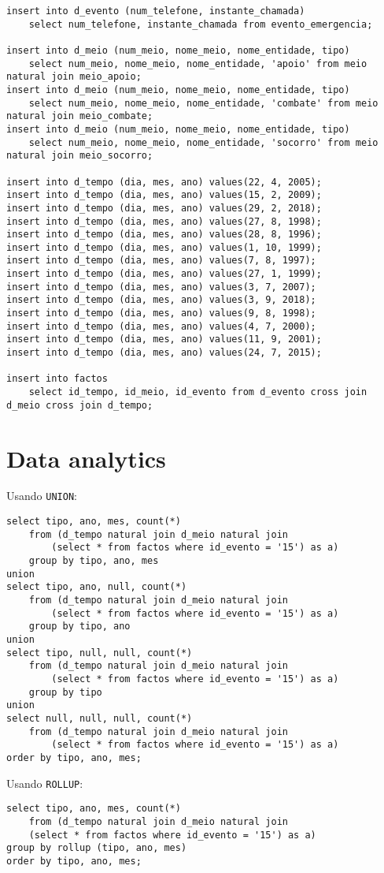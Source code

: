\documentclass[10pt,a4paper]{article}
\begin{document}
\begin{verbatim}
insert into d_evento (num_telefone, instante_chamada)
    select num_telefone, instante_chamada from evento_emergencia;

insert into d_meio (num_meio, nome_meio, nome_entidade, tipo)
    select num_meio, nome_meio, nome_entidade, 'apoio' from meio natural join meio_apoio;
insert into d_meio (num_meio, nome_meio, nome_entidade, tipo)
    select num_meio, nome_meio, nome_entidade, 'combate' from meio natural join meio_combate;
insert into d_meio (num_meio, nome_meio, nome_entidade, tipo)
    select num_meio, nome_meio, nome_entidade, 'socorro' from meio natural join meio_socorro;

insert into d_tempo (dia, mes, ano) values(22, 4, 2005);
insert into d_tempo (dia, mes, ano) values(15, 2, 2009);
insert into d_tempo (dia, mes, ano) values(29, 2, 2018);
insert into d_tempo (dia, mes, ano) values(27, 8, 1998);
insert into d_tempo (dia, mes, ano) values(28, 8, 1996);
insert into d_tempo (dia, mes, ano) values(1, 10, 1999);
insert into d_tempo (dia, mes, ano) values(7, 8, 1997);
insert into d_tempo (dia, mes, ano) values(27, 1, 1999);
insert into d_tempo (dia, mes, ano) values(3, 7, 2007);
insert into d_tempo (dia, mes, ano) values(3, 9, 2018);
insert into d_tempo (dia, mes, ano) values(9, 8, 1998);
insert into d_tempo (dia, mes, ano) values(4, 7, 2000);
insert into d_tempo (dia, mes, ano) values(11, 9, 2001);
insert into d_tempo (dia, mes, ano) values(24, 7, 2015);

insert into factos
    select id_tempo, id_meio, id_evento from d_evento cross join d_meio cross join d_tempo;
\end{verbatim}

\section{Data analytics}

Usando \texttt{UNION}:

\begin{verbatim}
select tipo, ano, mes, count(*)
    from (d_tempo natural join d_meio natural join
        (select * from factos where id_evento = '15') as a) 
    group by tipo, ano, mes
union
select tipo, ano, null, count(*) 
    from (d_tempo natural join d_meio natural join
        (select * from factos where id_evento = '15') as a) 
    group by tipo, ano
union
select tipo, null, null, count(*) 
    from (d_tempo natural join d_meio natural join
        (select * from factos where id_evento = '15') as a) 
    group by tipo
union
select null, null, null, count(*) 
    from (d_tempo natural join d_meio natural join
        (select * from factos where id_evento = '15') as a)
order by tipo, ano, mes;
\end{verbatim}

Usando \texttt{ROLLUP}:

\begin{verbatim}
select tipo, ano, mes, count(*)
    from (d_tempo natural join d_meio natural join
    (select * from factos where id_evento = '15') as a)
group by rollup (tipo, ano, mes)
order by tipo, ano, mes;
\end{verbatim}
\end{document}
